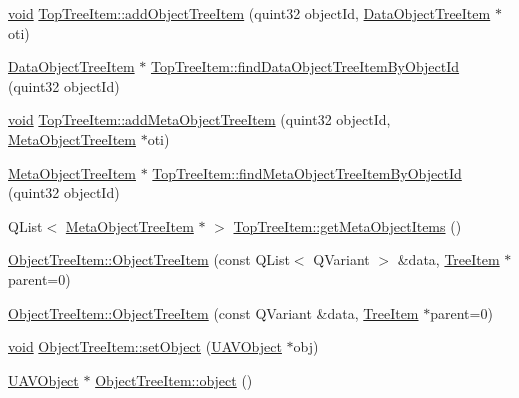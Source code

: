 \begin{DoxyCompactItemize}
\item 
\hyperlink{group___u_a_v_objects_plugin_ga444cf2ff3f0ecbe028adce838d373f5c}{void} \hyperlink{group___u_a_v_object_browser_plugin_ga0bf12ffb3c9062983ea24eb70eb04d10}{\-Top\-Tree\-Item\-::add\-Object\-Tree\-Item} (quint32 object\-Id, \hyperlink{class_data_object_tree_item}{\-Data\-Object\-Tree\-Item} $\ast$oti)
\item 
\hyperlink{class_data_object_tree_item}{\-Data\-Object\-Tree\-Item} $\ast$ \hyperlink{group___u_a_v_object_browser_plugin_ga75602e9fca2d0a49f5463712ac8b1d30}{\-Top\-Tree\-Item\-::find\-Data\-Object\-Tree\-Item\-By\-Object\-Id} (quint32 object\-Id)
\item 
\hyperlink{group___u_a_v_objects_plugin_ga444cf2ff3f0ecbe028adce838d373f5c}{void} \hyperlink{group___u_a_v_object_browser_plugin_gad58a2bd3f036f91b012a93876993bdff}{\-Top\-Tree\-Item\-::add\-Meta\-Object\-Tree\-Item} (quint32 object\-Id, \hyperlink{class_meta_object_tree_item}{\-Meta\-Object\-Tree\-Item} $\ast$oti)
\item 
\hyperlink{class_meta_object_tree_item}{\-Meta\-Object\-Tree\-Item} $\ast$ \hyperlink{group___u_a_v_object_browser_plugin_gaa9790dc57ee25280838c1828d5991f92}{\-Top\-Tree\-Item\-::find\-Meta\-Object\-Tree\-Item\-By\-Object\-Id} (quint32 object\-Id)
\item 
\-Q\-List$<$ \hyperlink{class_meta_object_tree_item}{\-Meta\-Object\-Tree\-Item} $\ast$ $>$ \hyperlink{group___u_a_v_object_browser_plugin_gad60c68296e476007863dd24d950daf5e}{\-Top\-Tree\-Item\-::get\-Meta\-Object\-Items} ()
\item 
\hyperlink{group___u_a_v_object_browser_plugin_ga5e60cc8ad10984411923efa677042087}{\-Object\-Tree\-Item\-::\-Object\-Tree\-Item} (const \-Q\-List$<$ \-Q\-Variant $>$ \&data, \hyperlink{class_tree_item}{\-Tree\-Item} $\ast$parent=0)
\item 
\hyperlink{group___u_a_v_object_browser_plugin_gafad6566ac62ae971f53230a0ec190070}{\-Object\-Tree\-Item\-::\-Object\-Tree\-Item} (const \-Q\-Variant \&data, \hyperlink{class_tree_item}{\-Tree\-Item} $\ast$parent=0)
\item 
\hyperlink{group___u_a_v_objects_plugin_ga444cf2ff3f0ecbe028adce838d373f5c}{void} \hyperlink{group___u_a_v_object_browser_plugin_ga5484d17e330931614680cfac5a1d1d3d}{\-Object\-Tree\-Item\-::set\-Object} (\hyperlink{class_u_a_v_object}{\-U\-A\-V\-Object} $\ast$obj)
\item 
\hyperlink{class_u_a_v_object}{\-U\-A\-V\-Object} $\ast$ \hyperlink{group___u_a_v_object_browser_plugin_gac539f66530cd71a2b0b562cb5e2accc7}{\-Object\-Tree\-Item\-::object} ()

\end{DoxyCompactItemize}
